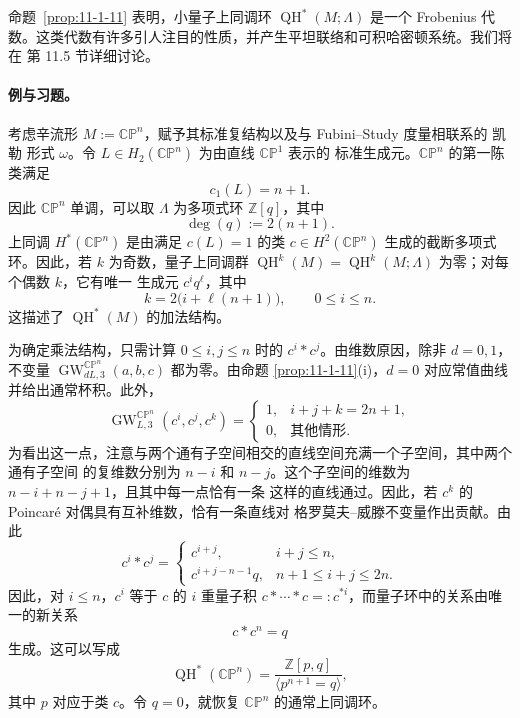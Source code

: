 命题~\ref{prop:11-1-11} 表明，小量子上同调环 $\operatorname{QH}^*(M;\Lambda)$ 是一个
Frobenius 代数。这类代数有许多引人注目的性质，并产生平坦联络和可积哈密顿系统。我们将在
第 11.5 节详细讨论。

\paragraph{例与习题。}

\begin{example}[复射影空间]\label{ex:11-1-12}
考虑辛流形 $M:=\mathbb{CP}^n$，赋予其标准复结构以及与 Fubini--Study 度量相联系的
凯勒 形式 $\omega$。令 $L\in H_2(\mathbb{CP}^n)$ 为由直线 $\mathbb{CP}^1$ 表示的
标准生成元。$\mathbb{CP}^n$ 的第一陈类满足
\[
  c_1(L)=n+1.
\]
因此 $\mathbb{CP}^n$ 单调，可以取 $\Lambda$ 为多项式环 $\mathbb Z[q]$，其中
\[
  \deg(q):=2(n+1).
\]
上同调 $H^*(\mathbb{CP}^n)$ 是由满足 $c(L)=1$ 的类
$c\in H^2(\mathbb{CP}^n)$ 生成的截断多项式环。因此，若 $k$ 为奇数，量子上同调群
$\operatorname{QH}^k(M)=\operatorname{QH}^k(M;\Lambda)$ 为零；对每个偶数 $k$，它有唯一
生成元 $c^iq^\ell$，其中
\[
  k=2\bigl(i+\ell(n+1)\bigr),\qquad0\le i\le n.
\]
这描述了 $\operatorname{QH}^*(M)$ 的加法结构。

为确定乘法结构，只需计算 $0\le i,j\le n$ 时的 $c^i*c^j$。由维数原因，除非 $d=0,1$，
不变量 $\operatorname{GW}_{dL,3}^{\mathbb{CP}^n}(a,b,c)$ 都为零。由命题
\ref{prop:11-1-11}(i)，$d=0$ 对应常值曲线并给出通常杯积。此外，
\[
  \operatorname{GW}_{L,3}^{\mathbb{CP}^n}(c^i,c^j,c^k)
  =
  \begin{cases}
  1,&i+j+k=2n+1,\\
  0,&\text{其他情形}.
  \end{cases}
\]
为看出这一点，注意与两个通有子空间相交的直线空间充满一个子空间，其中两个通有子空间
的复维数分别为 $n-i$ 和 $n-j$。这个子空间的维数为 $n-i+n-j+1$，且其中每一点恰有一条
这样的直线通过。因此，若 $c^k$ 的 Poincaré 对偶具有互补维数，恰有一条直线对
格罗莫夫--威滕不变量作出贡献。由此
\[
  c^i*c^j=
  \begin{cases}
  c^{i+j},&i+j\le n,\\
  c^{i+j-n-1}q,&n+1\le i+j\le2n.
  \end{cases}
\]
因此，对 $i\le n$，$c^i$ 等于 $c$ 的 $i$ 重量子积
$c*\cdots*c=:c^{*i}$，而量子环中的关系由唯一的新关系
\[
  c*c^n=q
\]
生成。这可以写成
\[
  \operatorname{QH}^*(\mathbb{CP}^n)
  =\frac{\mathbb Z[p,q]}{\langle p^{n+1}=q\rangle},
\]
其中 $p$ 对应于类 $c$。令 $q=0$，就恢复 $\mathbb{CP}^n$ 的通常上同调环。
\end{example}

